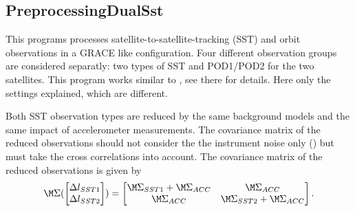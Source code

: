 \subsection{PreprocessingDualSst}\label{PreprocessingDualSst}
This programs processes satellite-to-satellite-tracking (SST) and orbit observations in a GRACE like configuration.
Four different observation groups are considered separatly: two types of SST and POD1/POD2 for the two satellites.
This program works similar to , see there for details. Here only the settings explained,
which are different.

Both SST observation types are reduced by the same background models and the same impact
of accelerometer measurements. The covariance matrix of the reduced observations should not consider
the the instrument noise only () but must
take the cross correlations  into account.
The covariance matrix of the reduced observations is given by
\begin{equation}
  \M\Sigma(\begin{bmatrix} \Delta l_{SST1} \\ \Delta l_{SST2} \end{bmatrix})
  = \begin{bmatrix} \M\Sigma_{SST1} + \M\Sigma_{ACC} & \M\Sigma_{ACC} \\
                   \M\Sigma_{ACC} & \M\Sigma_{SST2} + \M\Sigma_{ACC}
    \end{bmatrix}.
\end{equation}


